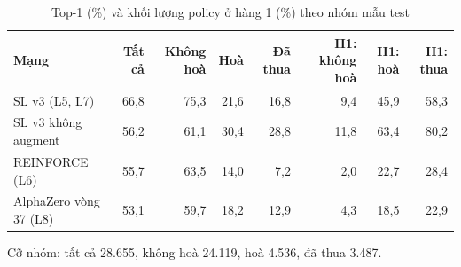 \begin{table}[H]
  \centering
  \scriptsize
  \caption{Top-1 (\%) và khối lượng policy ở hàng 1 (\%) theo nhóm mẫu test}
  \label{tab:cs-dl-mang}
  \begin{tabular}{lrrrrrrr}
    \toprule
    Mạng & Tất cả & Không hoà & Hoà & Đã thua & H1: không hoà & H1: hoà & H1: thua \\
    \midrule
    SL v3 (L5, L7) & 66,8 & 75,3 & 21,6 & 16,8 & 9,4 & 45,9 & 58,3 \\
    SL v3 không augment & 56,2 & 61,1 & 30,4 & 28,8 & 11,8 & 63,4 & 80,2 \\
    REINFORCE (L6) & 55,7 & 63,5 & 14,0 & 7,2 & 2,0 & 22,7 & 28,4 \\
    AlphaZero vòng 37 (L8) & 53,1 & 59,7 & 18,2 & 12,9 & 4,3 & 18,5 & 22,9 \\
    \bottomrule
  \end{tabular}
  \par\smallskip\parbox{.95\linewidth}{\footnotesize Cỡ nhóm: tất cả 28.655, không hoà 24.119, hoà 4.536, đã thua 3.487.}
\end{table}
